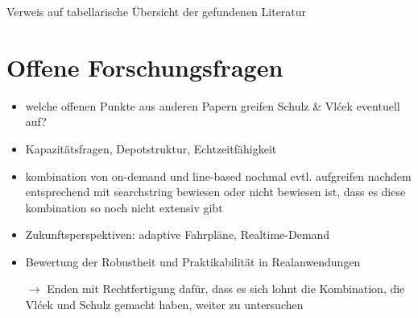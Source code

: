 Verweis auf tabellarische Übersicht der gefundenen Literatur %

\section{Offene Forschungsfragen}
\label{sec:2.3}
\label{sec:OffeneForschungsfragen}
\begin{itemize}
    \item welche offenen Punkte aus anderen Papern greifen Schulz \& Vlćek eventuell auf?
    \item Kapazitätsfragen, Depotstruktur, Echtzeitfähigkeit
    \item kombination von on-demand und line-based nochmal evtl. aufgreifen nachdem entsprechend mit searchstring bewiesen oder nicht bewiesen ist, dass es diese kombination so noch nicht extensiv gibt
    \item Zukunftsperspektiven: adaptive Fahrpläne, Realtime-Demand
    \item Bewertung der Robustheit und Praktikabilität in Realanwendungen
    
    $\rightarrow$ Enden mit Rechtfertigung dafür, dass es sich lohnt die Kombination, die Vlćek und Schulz gemacht haben, weiter zu untersuchen
\end{itemize}

